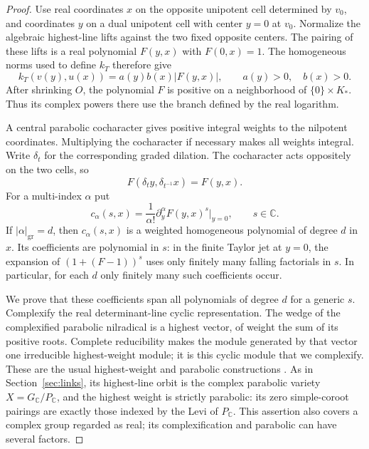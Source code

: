 \begin{proof}
Use real coordinates $x$ on the opposite unipotent cell determined by
$v_0$, and coordinates $y$ on a dual unipotent cell with center $y=0$
at $v_0$.  Normalize the algebraic highest-line lifts against the two
fixed opposite centers.  The pairing of these lifts is a real
polynomial $F(y,x)$ with $F(0,x)=1$.  The homogeneous norms used to
define $k_T$ therefore give
\begin{equation}
 \label{eq:gluing-normalized-pairing}
 k_T(v(y),u(x))=a(y)b(x)|F(y,x)|,
 \qquad a(y)>0,\quad b(x)>0.
\end{equation}
After shrinking $O$, the polynomial $F$ is positive on a neighborhood
of $\{0\}\times K_*$.  Thus its complex powers there use the branch
defined by the real logarithm.

A central parabolic cocharacter gives positive integral weights to
the nilpotent coordinates.  Multiplying the cocharacter if necessary
makes all weights integral.  Write $\delta_t$ for the corresponding
graded dilation.  The cocharacter acts oppositely on the two cells, so
\[
 F(\delta_t y,\delta_{t^{-1}}x)=F(y,x).
\]
For a multi-index $\alpha$ put
\[
 c_\alpha(s,x)=\frac{1}{\alpha!}
       \partial_y^\alpha F(y,x)^s\big|_{y=0},\qquad s\in\mathbb C.
\]
If $|\alpha|_{\mathrm{gr}}=d$, then $c_\alpha(s,x)$ is a weighted
homogeneous polynomial of degree $d$ in $x$.  Its coefficients are
polynomial in $s$: in the finite Taylor jet at $y=0$, the expansion
of $(1+(F-1))^s$ uses only finitely many falling factorials in $s$.
In particular, for each $d$ only finitely many such coefficients
occur.

We prove that these coefficients span all polynomials of degree $d$
for a generic $s$.  Complexify the real determinant-line cyclic
representation.  The wedge of the complexified parabolic nilradical
is a highest vector, of weight the sum of its positive roots.
Complete reducibility makes the module generated by that vector
one irreducible highest-weight module; it is this cyclic module
that we complexify.  These are the usual highest-weight and
parabolic constructions \cite{Humphreys1972,Borel1991}.
As in Section~\ref{sec:links}, its highest-line
orbit is the complex parabolic variety $X=G_{\mathbb C}/P_{\mathbb C}$,
and the highest weight is strictly parabolic: its zero simple-coroot
pairings are exactly those indexed by the Levi of $P_{\mathbb C}$.
This assertion also covers a complex group regarded as real; its
complexification and parabolic can have several factors.


\end{proof}
